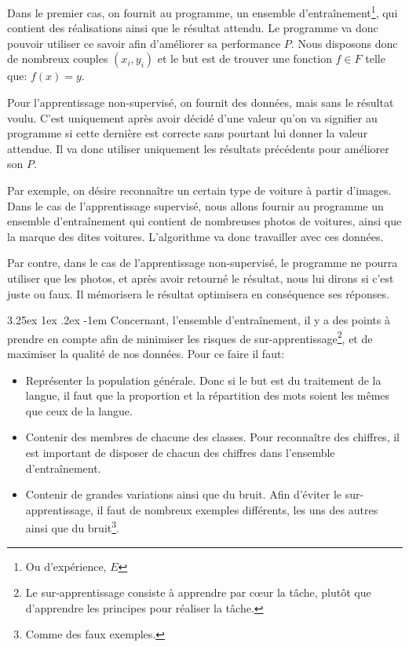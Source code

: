 \documentclass[a4paper, 11pt]{article}
\makeatletter
\renewcommand\paragraph{\@startsection{paragraph}{5}{\z@}%
  {3.25ex \@plus1ex \@minus.2ex}%
  {-1em}%
  {\normalfont\normalsize\bfseries}}
\makeatother
\begin{document}
Dans le premier cas, on fournit au programme, un ensemble d'entraînement\footnote{Ou d'expérience, $E$},
qui contient des réalisations ainsi que le résultat attendu. 
Le programme va donc pouvoir utiliser ce savoir afin d'améliorer sa performance $P$.
Nous disposons donc de nombreux couples $(x_i, y_i)$ et le but est de trouver une fonction $f \in F$ telle que: $f(x) = y$.

Pour l'apprentissage non-supervisé, on fournit des données, mais sans le résultat voulu.
C'est uniquement après avoir décidé d'une valeur qu'on va signifier au programme si cette dernière est correcte sans pourtant lui donner la valeur attendue. Il va donc utiliser uniquement les résultats précédents pour améliorer son $P$.

Par exemple, on désire reconnaître un certain type de voiture à partir d'images. Dans le cas de l'apprentissage supervisé,
nous allons fournir au programme un ensemble d'entraînement qui contient de nombreuses photos de voitures,
ainsi que la marque des dites voitures. L'algorithme va donc travailler avec ces données.

Par contre, dans le cas de l'apprentissage non-supervisé, le programme ne pourra utiliser que les photos,
et après avoir retourné le résultat, nous lui dirons si c'est juste ou faux. Il mémorisera le résultat 
optimisera en conséquence ses réponses.

\paragraph{}
Concernant, l'ensemble d'entraînement, il y a des points à prendre en compte afin de minimiser les risques de sur-apprentissage\footnote{Le sur-apprentissage consiste à apprendre par cœur la tâche, plutôt que d'apprendre les principes pour réaliser la tâche.}, et de maximiser la qualité de nos données.
Pour ce faire il faut:\label{astuce ensemble d'entraînement}
\begin{itemize}
\item Représenter la population générale. Donc si le but est du traitement de la langue, 
il faut que la proportion et la répartition des mots soient les mêmes que ceux de la langue.

\item Contenir des membres de chacune des classes. Pour reconnaître des chiffres, il est important de disposer de chacun 
des chiffres dans l'ensemble d'entraînement.
\item Contenir de grandes variations ainsi que du bruit. Afin d'éviter le sur-apprentissage, 
il faut de nombreux exemples différents, les uns des autres ainsi que 
du bruit\footnote{Comme des faux exemples.}.
\end{itemize}
\end{document}

